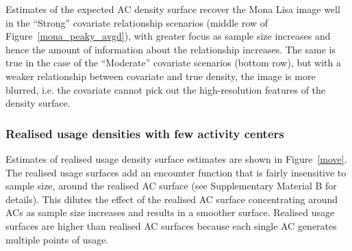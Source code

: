 \documentclass[10pt,a4paper]{article}
\begin{document}
Estimates of the expected AC density surface recover the Mona Lisa image well in the ``Strong'' covariate relationship scenarios (middle row of Figure~\ref{mona_peaky_avgd}), with greater focus as sample size increases and hence the amount of information about the relationship increases. The same is true in the case of the ``Moderate'' covariate scenarios (bottom row), but with a weaker relationship between covariate and true density, the image is more blurred, i.e. the covariate cannot pick out the high-resolution features of the density surface.

\subsubsection{Realised usage densities with few activity centers}

Estimates of realised usage density surface estimates are shown in Figure~\ref{move}. The realised usage surfaces add an encounter function that is fairly insensitive to sample size, around the realised AC surface (see Supplementary Material B for details). This dilutes the effect of the realised AC surface concentrating around ACs as sample size increases and results in a smoother surface. Realised usage surfaces are higher than realised AC surfaces because each single AC generates multiple points of usage.

\end{document}
